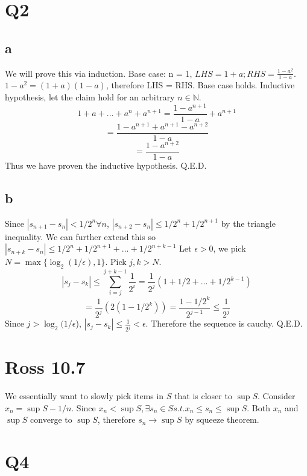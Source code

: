 \documentclass[12pt]{article}
\newcommand{\N}{\mathbb{N}}
\begin{document}
\section{Q2}
\subsection{a}
We will prove this via induction.
\newline
Base case: n = 1, $LHS = 1+a; RHS = \frac{1-a^{2}}{1-a}$. $1-a^2 = (1+a)(1-a)$, therefore LHS = RHS. Base case holds.
\newline
Inductive hypothesis, let the claim hold for an arbitrary $n \in \N$.
$$1+a+...+a^n+a^{n+1} = \frac{1-a^{n+1}}{1-a}+a^{n+1}$$
$$=\frac{1-a^{n+1}+a^{n+1}-a^{n+2}}{1-a}$$
$$=\frac{1-a^{n+2}}{1-a}$$
Thus we have proven the inductive hypothesis. Q.E.D.

\subsection{b}
Since $|s_{n+1}-s_n|<1/2^n \forall n$, $|s_{n+2}-s_n| \leq 1/2^n + 1/2^{n+1}$ by the triangle inequality. We can further extend this so $|s_{n+k}-s_n| \leq 1/2^n + 1/2^{n+1} + ... +1/2^{n+k-1}$
\newline
Let $\epsilon > 0$, we pick $N = \max \{ \log_2 (1/\epsilon), 1\}$. Pick $j,k > N$.
$$|s_j - s_k| \leq \sum ^{j+k-1}_{i=j} \frac{1}{2^i} = \frac{1}{2^j}(1+1/2+...+1/2^{k-1})$$
$$=\frac{1}{2^j}(2(1-1/2^{k})) = \frac{1-1/2^k}{2^{j-1}} \leq \frac{1}{2^j}$$
Since $j> \log_2 (1/\epsilon$), $|s_j - s_k|\leq \frac{1}{2^j} < \epsilon$.
\newline
Therefore the sequence is cauchy. Q.E.D.
\newpage


\section{Ross 10.7}
We essentially want to slowly pick items in $S$ that is closer to $\sup S$.
\newline
Consider $x_n = \sup S - 1/n$. Since $x_n < \sup S, \exists s_n \in S s.t. x_n \leq s_n \leq \sup S$. Both $x_n$ and $\sup S$ converge to $\sup S$, therefore $s_n \to \sup S$ by squeeze theorem.
\newpage


\section{Q4}
\end{document}
